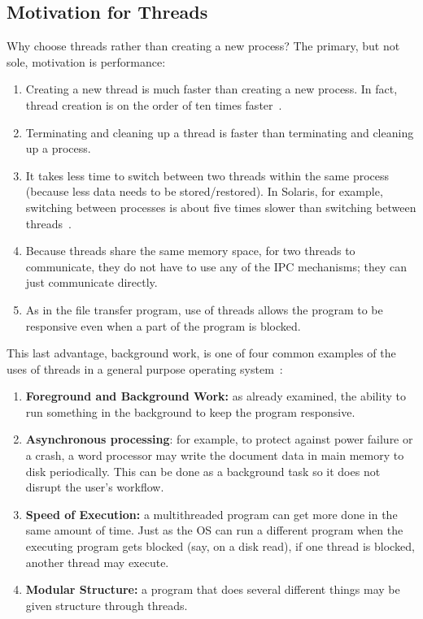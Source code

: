 \subsection*{Motivation for Threads}

Why choose threads rather than creating a new process? The primary, but not sole, motivation is performance:
\begin{enumerate}
	\item Creating a new thread is much faster than creating a new process. In fact, thread creation is on the order of ten times faster~\cite{machThreads}.
	\item Terminating and cleaning up a thread is faster than terminating and cleaning up a process.
	\item It takes less time to switch between two threads within the same process (because less data needs to be stored/restored). In Solaris, for example, switching between processes is about five times slower than switching between threads~\cite{osc}.
	\item Because threads share the same memory space, for two threads to communicate, they do not have to use any of the IPC mechanisms; they can just communicate directly.
	\item As in the file transfer program, use of threads allows the program to be responsive even when a part of the program is blocked.
\end{enumerate}

This last advantage, background work, is one of four common examples of the uses of threads in a general purpose operating system~\cite{insideOS2}:
\begin{enumerate}
	\item \textbf{Foreground and Background Work:} as already examined, the ability to run something in the background to keep the program responsive.
	\item \textbf{Asynchronous processing}: for example, to protect against power failure or a crash, a word processor may write the document data in main memory to disk periodically. This can be done as a background task so it does not disrupt the user's workflow.
	\item \textbf{Speed of Execution:} a multithreaded program can get more done in the same amount of time. Just as the OS can run a different program when the executing program gets blocked (say, on a disk read), if one thread is blocked, another thread may execute.
	\item \textbf{Modular Structure:} a program that does several different things may be given structure through threads.
\end{enumerate}

